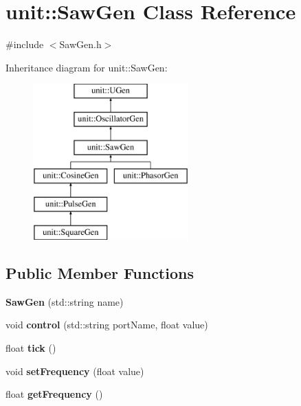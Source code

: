 \hypertarget{classunit_1_1SawGen}{}\section{unit\+:\+:Saw\+Gen Class Reference}
\label{classunit_1_1SawGen}


{\ttfamily \#include $<$Saw\+Gen.\+h$>$}

Inheritance diagram for unit\+:\+:Saw\+Gen\+:\begin{figure}[H]
\begin{center}
\leavevmode
\includegraphics[height=6.000000cm]{classunit_1_1SawGen}
\end{center}
\end{figure}
\subsection*{Public Member Functions}
\begin{DoxyCompactItemize}
\item 
{\bfseries Saw\+Gen} (std\+::string name)\hypertarget{classunit_1_1SawGen_a24c35afc1bdb237a8a5d1eb3888ce0bc}{}\label{classunit_1_1SawGen_a24c35afc1bdb237a8a5d1eb3888ce0bc}

\item 
void {\bfseries control} (std\+::string port\+Name, float value)\hypertarget{classunit_1_1SawGen_a515f6eb82a1a97ee434144b8c58133b8}{}\label{classunit_1_1SawGen_a515f6eb82a1a97ee434144b8c58133b8}

\item 
float {\bfseries tick} ()\hypertarget{classunit_1_1SawGen_a18c6704aec8f20a5605ff72d674c7516}{}\label{classunit_1_1SawGen_a18c6704aec8f20a5605ff72d674c7516}

\item 
void {\bfseries set\+Frequency} (float value)\hypertarget{classunit_1_1SawGen_a1a77058c93e7f7b3fe4b355953674678}{}\label{classunit_1_1SawGen_a1a77058c93e7f7b3fe4b355953674678}

\item 
float {\bfseries get\+Frequency} ()\hypertarget{classunit_1_1SawGen_a0f08973bebb28aa1a059ccce09e5ebdf}{}\label{classunit_1_1SawGen_a0f08973bebb28aa1a059ccce09e5ebdf}

\end{DoxyCompactItemize}
